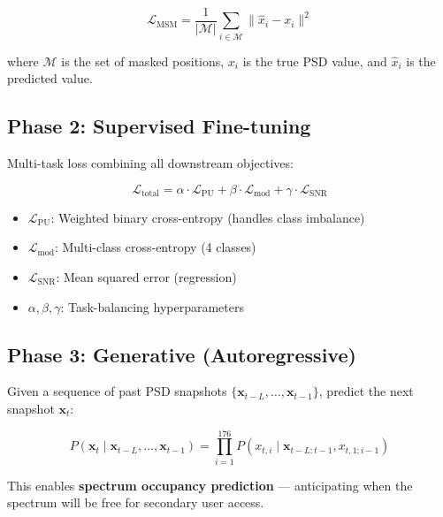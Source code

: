 \documentclass[12pt, a4paper]{article}
\begin{document}
\begin{equation}
    \mathcal{L}_\text{MSM} = \frac{1}{|\mathcal{M}|} \sum_{i \in \mathcal{M}} \| \hat{x}_i - x_i \|^2
\end{equation}

where $\mathcal{M}$ is the set of masked positions, $x_i$ is the true PSD value, and $\hat{x}_i$ is the predicted value.


\subsection{Phase 2: Supervised Fine-tuning}

Multi-task loss combining all downstream objectives:

\begin{equation}
    \mathcal{L}_\text{total} = \alpha \cdot \mathcal{L}_\text{PU} + \beta \cdot \mathcal{L}_\text{mod} + \gamma \cdot \mathcal{L}_\text{SNR}
\end{equation}

\begin{itemize}[leftmargin=1.5em]
    \item $\mathcal{L}_\text{PU}$: Weighted binary cross-entropy (handles class imbalance)
    \item $\mathcal{L}_\text{mod}$: Multi-class cross-entropy (4 classes)
    \item $\mathcal{L}_\text{SNR}$: Mean squared error (regression)
    \item $\alpha, \beta, \gamma$: Task-balancing hyperparameters
\end{itemize}


\subsection{Phase 3: Generative (Autoregressive)}

Given a sequence of past PSD snapshots $\{\mathbf{x}_{t-L}, \ldots, \mathbf{x}_{t-1}\}$, predict the next snapshot $\mathbf{x}_t$:

\begin{equation}
    P(\mathbf{x}_t \mid \mathbf{x}_{t-L}, \ldots, \mathbf{x}_{t-1}) = \prod_{i=1}^{176} P(x_{t,i} \mid \mathbf{x}_{t-L:t-1}, x_{t,1:i-1})
\end{equation}

This enables \textbf{spectrum occupancy prediction} — anticipating when the spectrum will be free for secondary user access.


\end{document}
